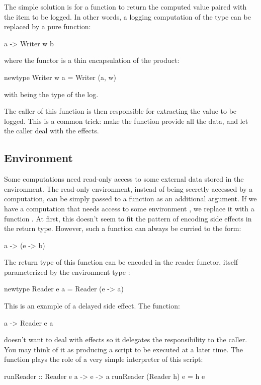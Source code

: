 \documentclass[DaoFP]{subfiles}
\begin{document}
The simple solution is for a function to return the computed value paired with the item to be logged. In other words, a logging computation of the type  can be replaced by a pure function:
\begin{haskell}
a -> Writer w b
\end{haskell}
where the  functor is a thin encapsulation of the product:
\begin{haskell}
newtype Writer w a = Writer (a, w)
\end{haskell}
with  being the type of the log.

The caller of this function is then responsible for extracting the value to be logged. This is a common trick: make the function provide all the data, and let the caller deal with the effects.

\subsection{Environment}

Some computations need read-only access to some external data stored in the environment. The read-only environment, instead of being secretly accessed by a computation, can be simply passed to a function as an additional argument. If we have a computation  that needs access to some environment , we replace it with a function . At first, this doesn't seem to fit the pattern of encoding side effects in the return type. However, such a function can always be curried to the form:
\begin{haskell}
a -> (e -> b)
\end{haskell}
The return type of this function can be encoded in the reader functor, itself parameterized by the environment type :
\begin{haskell}
newtype Reader e a = Reader (e -> a)
\end{haskell}

This is an example of a delayed side effect. The function:
\begin{haskell}
a -> Reader e a
\end{haskell}
doesn't want to deal with effects so it delegates the responsibility to the caller. You may think of it as producing a script to be executed at a later time. The function  plays the role of a very simple interpreter of this script:
\begin{haskell}
runReader :: Reader e a -> e -> a
runReader (Reader h) e = h e
\end{haskell}
\end{document}
